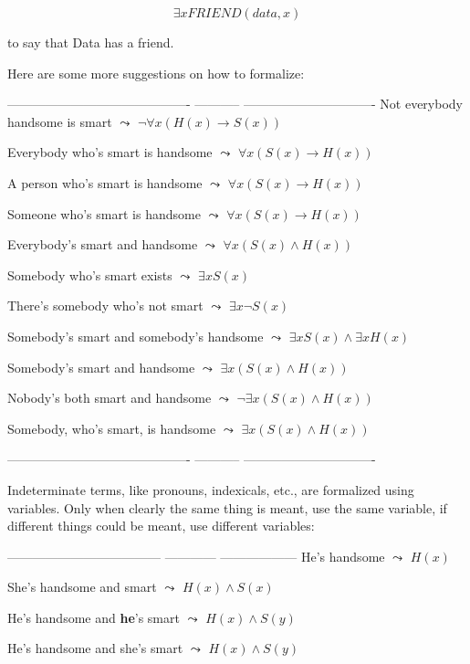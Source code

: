 \documentclass[11pt]{article}
\begin{document}
$$\exists xFRIEND(data,x)$$

to say that Data has a friend.

Here are some more suggestions on how to formalize:

------------------------------------------- ----------- -------------------------------
Not everybody handsome is smart             \(\leadsto\)  \(\neg\forall x(H(x)\rightarrow S(x))\)

Everybody who's smart is handsome           \(\leadsto\)  \(\forall x(S(x)\rightarrow H(x))\)

A person who's smart is handsome            \(\leadsto\)  \(\forall x(S(x)\rightarrow H(x))\)

Someone who's smart is handsome             \(\leadsto\)  \(\forall x(S(x)\rightarrow H(x))\)

Everybody's smart and handsome              \(\leadsto\)  \(\forall x(S(x)\land H(x))\)

Somebody who's smart exists                 \(\leadsto\)  \(\exists x S(x)\)

There's somebody who's not smart            \(\leadsto\)  \(\exists x\neg S(x)\)

Somebody's smart and somebody's handsome    \(\leadsto\)  \(\exists xS(x)\land \exists xH(x)\)

Somebody's smart and handsome               \(\leadsto\)  \(\exists x(S(x)\land H(x))\)

Nobody's both smart and handsome            \(\leadsto\)  \(\neg\exists x(S(x)\land H(x))\)

Somebody, who's smart, is handsome          \(\leadsto\)  \(\exists x(S(x)\land H(x))\)

------------------------------------------- ----------- -------------------------------

Indeterminate terms, like pronouns, indexicals, etc., are formalized using variables. Only when clearly the same thing is meant, use the same variable, if different things could be meant, use different variables:

------------------------------------ ------------ ------------------
He's handsome                         \(\leadsto\)  \(H(x)\)

She's handsome and smart              \(\leadsto\)  \(H(x)\land S(x)\)

He's handsome and \textbf{he}'s smart        \(\leadsto\)  \(H(x)\land S(y)\)

He's handsome and she's smart         \(\leadsto\)  \(H(x)\land S(y)\)
\end{document}
